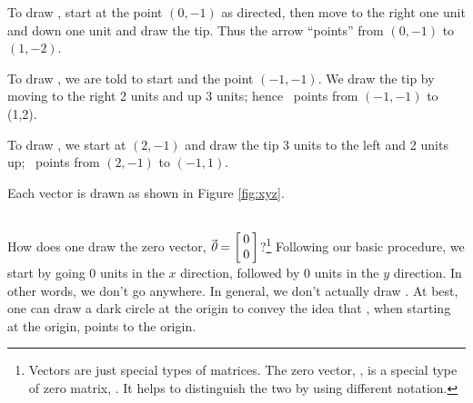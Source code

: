 {To draw \vx, start at the point $(0,-1)$ as directed, then move to the right one unit and down one unit and draw the tip. Thus the arrow ``points'' from $(0,-1)$ to $(1,-2)$.

To draw \vy, we are told to start and the point $(-1,-1)$. We draw the tip by moving to the right 2 units and up 3 units; hence \vy\ points from $(-1,-1)$ to (1,2).

To draw \vz, we start at $(2,-1)$ and draw the tip 3 units to the left and 2 units up; \vz\ points from $(2,-1)$ to $(-1,1)$.

Each vector is drawn as shown in Figure \ref{fig:xyz}.

\begin{myfigure}%
\begin{center}
\end{center}
\label{fig:xyz}
\end{myfigure}
{}\baselineskip}\\

How does one draw the zero vector, $\zero =\bmx{c}0\\0\emx$?\footnote{Vectors are just special types of matrices. The zero vector, \zero, is a special type of zero matrix, \tto. It helps to distinguish the two by using different notation.} Following our basic procedure, we start by going 0 units in the $x$ direction, followed by 0 units in the $y$ direction. In other words, we don't go anywhere. 
In general, we don't actually draw \zero. At best, one can draw a dark circle at the origin to convey the idea that \zero, when starting at the origin, points to the origin.

